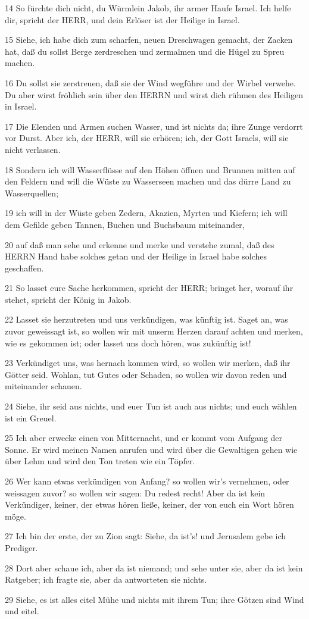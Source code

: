 \par 14 So fürchte dich nicht, du Würmlein Jakob, ihr armer Haufe Israel. Ich helfe dir, spricht der HERR, und dein Erlöser ist der Heilige in Israel.
\par 15 Siehe, ich habe dich zum scharfen, neuen Dreschwagen gemacht, der Zacken hat, daß du sollst Berge zerdreschen und zermalmen und die Hügel zu Spreu machen.
\par 16 Du sollst sie zerstreuen, daß sie der Wind wegführe und der Wirbel verwehe. Du aber wirst fröhlich sein über den HERRN und wirst dich rühmen des Heiligen in Israel.
\par 17 Die Elenden und Armen suchen Wasser, und ist nichts da; ihre Zunge verdorrt vor Durst. Aber ich, der HERR, will sie erhören; ich, der Gott Israels, will sie nicht verlassen.
\par 18 Sondern ich will Wasserflüsse auf den Höhen öffnen und Brunnen mitten auf den Feldern und will die Wüste zu Wasserseen machen und das dürre Land zu Wasserquellen;
\par 19 ich will in der Wüste geben Zedern, Akazien, Myrten und Kiefern; ich will dem Gefilde geben Tannen, Buchen und Buchsbaum miteinander,
\par 20 auf daß man sehe und erkenne und merke und verstehe zumal, daß des HERRN Hand habe solches getan und der Heilige in Israel habe solches geschaffen.
\par 21 So lasset eure Sache herkommen, spricht der HERR; bringet her, worauf ihr stehet, spricht der König in Jakob.
\par 22 Lasset sie herzutreten und uns verkündigen, was künftig ist. Saget an, was zuvor geweissagt ist, so wollen wir mit unserm Herzen darauf achten und merken, wie es gekommen ist; oder lasset uns doch hören, was zukünftig ist!
\par 23 Verkündiget uns, was hernach kommen wird, so wollen wir merken, daß ihr Götter seid. Wohlan, tut Gutes oder Schaden, so wollen wir davon reden und miteinander schauen.
\par 24 Siehe, ihr seid aus nichts, und euer Tun ist auch aus nichts; und euch wählen ist ein Greuel.
\par 25 Ich aber erwecke einen von Mitternacht, und er kommt vom Aufgang der Sonne. Er wird meinen Namen anrufen und wird über die Gewaltigen gehen wie über Lehm und wird den Ton treten wie ein Töpfer.
\par 26 Wer kann etwas verkündigen von Anfang? so wollen wir's vernehmen, oder weissagen zuvor? so wollen wir sagen: Du redest recht! Aber da ist kein Verkündiger, keiner, der etwas hören ließe, keiner, der von euch ein Wort hören möge.
\par 27 Ich bin der erste, der zu Zion sagt: Siehe, da ist's! und Jerusalem gebe ich Prediger.
\par 28 Dort aber schaue ich, aber da ist niemand; und sehe unter sie, aber da ist kein Ratgeber; ich fragte sie, aber da antworteten sie nichts.
\par 29 Siehe, es ist alles eitel Mühe und nichts mit ihrem Tun; ihre Götzen sind Wind und eitel.

